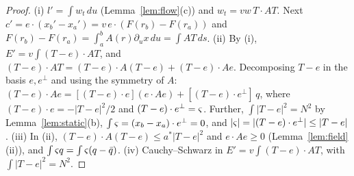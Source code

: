 \begin{proof}
(i) $l'=\int w_t\,du$ (Lemma~\ref{lem:flow}(c)) and $w_t=vw\,T\cdot AT$. Next $c'=e\cdot(x_b'-x_a')=v\,e\cdot(F(r_b)-F(r_a))$ and
$F(r_b)-F(r_a)=\int_a^bA(r)\partial_ux\,du=\int AT\,ds$.
(ii) By (i), $E'=v\int(T-e)\cdot AT$, and $(T-e)\cdot AT=(T-e)\cdot A(T-e)+(T-e)\cdot Ae$. Decomposing $T-e$ in the basis
$e,e^\perp$ and using the symmetry of $A$: $(T-e)\cdot Ae=[(T-e)\cdot e](e\cdot Ae)+[(T-e)\cdot e^\perp]\,q$, where
$(T-e)\cdot e=-|T-e|^2/2$ and $(T-e)\cdot e^\perp=\varsigma$. Further, $\int|T-e|^2=N^2$ by Lemma~\ref{lem:static}(b),
$\int\varsigma=(x_b-x_a)\cdot e^\perp=0$, and $|\varsigma|=|(T-e)\cdot e^\perp|\le|T-e|$.
(iii) In (ii), $(T-e)\cdot A(T-e)\le a^*|T-e|^2$ and $e\cdot Ae\ge0$ (Lemma~\ref{lem:field}(ii)), and $\int\varsigma q=\int\varsigma(q-\bar q)$.
(iv) Cauchy--Schwarz in $E'=v\int(T-e)\cdot AT$, with $\int|T-e|^2=N^2$.


\end{proof}
